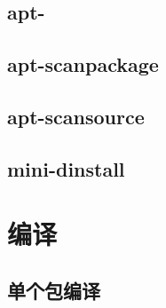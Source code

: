 \documentclass[a4paper,10pt]{article}
\begin{document}
\begin{CJK}{UTF8}{gbsn}
\section{apt-}
\subsection{}
\subsubsection{}

\section{apt-scanpackage}
\subsection{}
\subsubsection{}

\section{apt-scansource}
\subsection{}
\subsubsection{}

\section{mini-dinstall}
\subsection{}
\subsubsection{}

\chapter{编译}
\section{单个包编译}

\end{CJK}
\end{document}
